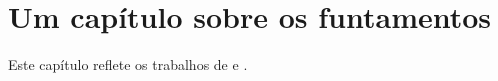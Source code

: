 \chapter{Um capítulo sobre os funtamentos}
\label{cap:fundamentos}

Este capítulo reflete os trabalhos de \textcite{knuth} e \textcite{lamport}.